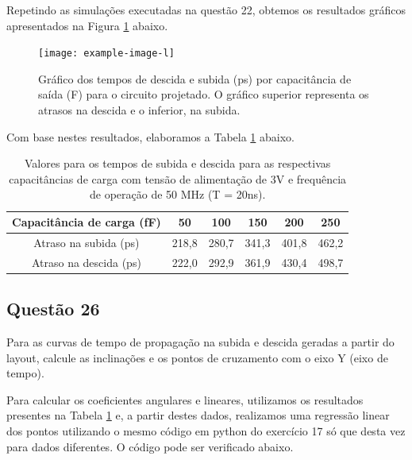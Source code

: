 \documentclass[12pt,a4paper]{article}
\begin{document}
Repetindo as simulações executadas na questão 22, obtemos os resultados gráficos apresentados na Figura \ref{fig:inverter_cc_delay_graphs} abaixo.

\begin{figure}[H]
    \centering
    \texttt{[image: example-image-l]}
    \caption{Gráfico dos tempos de descida e subida (ps) por capacitância de saída (F) para o circuito projetado. O gráfico superior representa os atrasos na descida e o inferior, na subida.}
    \label{fig:inverter_cc_delay_graphs}
\end{figure}

Com base nestes resultados, elaboramos a Tabela \ref{tab:inverter_delay_values} abaixo.

\begin{table}[H]
    \centering
    \caption{Valores para os tempos de subida e descida para as respectivas capacitâncias de carga com tensão de alimentação de 3V e frequência de operação de 50 MHz (T = 20ns).}
    \label{tab:inverter_delay_values}
    \begin{tabular}{cccccc}
        \toprule
        Capacitância de carga (fF) & 50 & 100 & 150 & 200 & 250 \\
        \midrule
        Atraso na subida (ps) & 218,8 & 280,7 & 341,3 & 401,8 & 462,2 \\
        Atraso na descida (ps) & 222,0 & 292,9 & 361,9 & 430,4 & 498,7 \\
        \bottomrule
    \end{tabular}
\end{table}

\subsection*{Questão 26}

Para as curvas de tempo de propagação na subida e descida geradas a partir do layout, calcule as inclinações e os pontos de cruzamento com o eixo Y (eixo de tempo).

Para calcular os coeficientes angulares e lineares, utilizamos os resultados presentes na Tabela \ref{tab:inverter_delay_values} e, a partir destes dados, realizamos uma regressão linear dos pontos utilizando o mesmo código em python do exercício 17 só que desta vez para dados diferentes. O código pode ser verificado abaixo.
\end{document}
